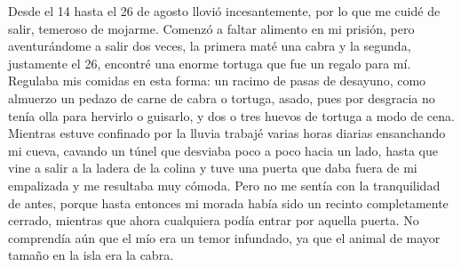 \documentclass{novela}
\begin{document}
    Desde el 14 hasta el 26 de agosto llovió incesantemente, por lo que me cuidé de salir, temeroso de mojarme. Comenzó a faltar alimento en mi prisión, pero aventurándome a salir dos veces, la primera maté una cabra y la segunda, justamente el 26, encontré una enorme tortuga que fue un regalo para mí. Regulaba mis comidas en esta forma: un racimo de pasas de desayuno, como almuerzo un pedazo de carne de cabra o tortuga, asado, pues por desgracia no tenía olla para hervirlo o guisarlo, y dos o tres huevos de tortuga a modo de cena.
    Mientras estuve confinado por la lluvia trabajé varias horas diarias ensanchando mi cueva, cavando un túnel que desviaba poco a poco hacia un lado, hasta que vine a salir a la ladera de la colina y tuve una puerta que daba fuera de mi empalizada y me resultaba muy cómoda. Pero no me sentía con la tranquilidad de antes, porque hasta entonces mi morada había sido un recinto completamente cerrado, mientras que ahora cualquiera podía entrar por aquella puerta. No comprendía aún que el mío era un temor infundado, ya que el animal de mayor tamaño en la isla era la cabra.
\end{document}
